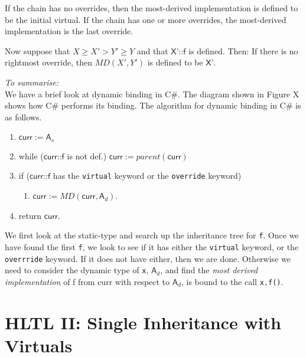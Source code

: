 If the chain has no overrides, then the most-derived implementation is defined to be the initial virtual.
If the chain has one or more overrides, the most-derived implementation is the last override. 

Now suppose that $X \geqslant X' > Y' \geqslant Y$ and that $\textsf{X'::f}$ is defined. Then:
If there is no rightmost override, then $MD(X',Y')$ is defined to be $\textsf{X'}$.


\frmrule

\textit{To summarise:} \\
We have a brief look at dynamic binding in C\#.
The diagram shown in Figure X shows how C\# performs its binding. 
The algorithm for dynamic binding in C\# is as follows.

\begin{enumerate} [nosep]
  \item $\textsf{curr} := \textsf{A}_{s}$
  \item while ($\textsf{curr::f}$ is not def.) $\textsf{curr} := parent(\textsf{curr})$
  \item if ($\textsf{curr::f}$ has the \lstinline{virtual} keyword or the \lstinline{override} keyword)
  \begin{enumerate} [nosep] 
    \item $\textsf{curr} := MD(\textsf{curr}, \textsf{A}_{d})$.
  \end{enumerate}
  \item return $\textsf{curr}$.
\end{enumerate}

We first look at the static-type and search up the inheritance tree for \lstinline{f}.
Once we have found the first \lstinline{f}, we look to see if it has 
either the \lstinline{virtual} keyword, or the \lstinline{overrride} keyword.
If it does not have either, then we are done. Otherwise we need 
to consider the dynamic type of \lstinline{x}, $\textsf{A}_{d}$, 
and find the \textit{most derived implementation} of \textsf{f} 
from \textsf{curr} with respect to $\textsf{A}_{d}$, is bound to the call \lstinline{x.f()}.

\frmrule


\section{HLTL II: Single Inheritance with Virtuals}

